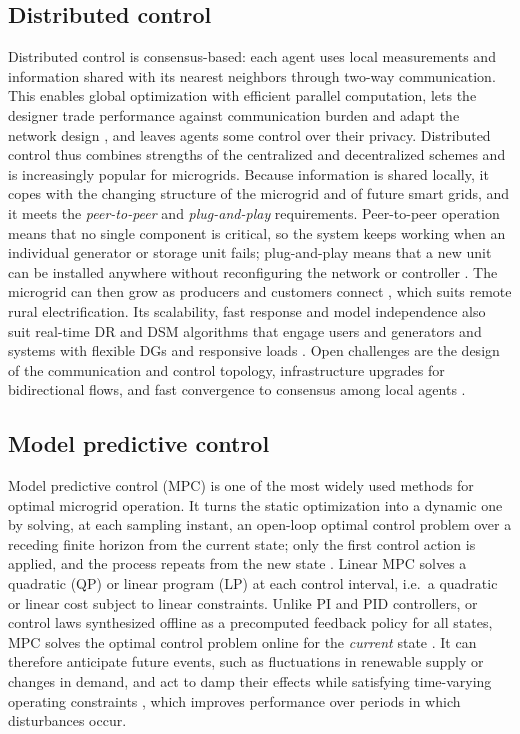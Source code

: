 \documentclass[final,3p,times]{elsarticle}
\begin{document}
\subsection{Distributed control}

Distributed control is consensus-based: each agent uses local measurements and information shared with its nearest neighbors through two-way communication. This enables global optimization with efficient parallel computation, lets the designer trade performance against communication burden and adapt the network design \cite{farina2012}, and leaves agents some control over their privacy. Distributed control thus combines strengths of the centralized and decentralized schemes and is increasingly popular for microgrids. Because information is shared locally, it copes with the changing structure of the microgrid and of future smart grids, and it meets the \textit{peer-to-peer} and \textit{plug-and-play} requirements. Peer-to-peer operation means that no single component is critical, so the system keeps working when an individual generator or storage unit fails; plug-and-play means that a new unit can be installed anywhere without reconfiguring the network or controller \cite{mg_prop}. The microgrid can then grow as producers and customers connect \cite{pourbabak2017}, which suits remote rural electrification. Its scalability, fast response and model independence also suit real-time DR and DSM algorithms that engage users and generators \cite{deng2014} and systems with flexible DGs and responsive loads \cite{dist_1, dist_2}. Open challenges are the design of the communication and control topology, infrastructure upgrades for bidirectional flows, and fast convergence to consensus among local agents \cite{pourbabak2017}.

\subsection{Model predictive control \label{app:mpc}}

Model predictive control (MPC) is one of the most widely used methods for optimal microgrid operation. It turns the static optimization into a dynamic one by solving, at each sampling instant, an open-loop optimal control problem over a receding finite horizon from the current state; only the first control action is applied, and the process repeats from the new state \cite{mpc}. Linear MPC solves a quadratic (QP) or linear program (LP) at each control interval, i.e.\ a quadratic or linear cost subject to linear constraints. Unlike PI and PID controllers, or control laws synthesized offline as a precomputed feedback policy for all states, MPC solves the optimal control problem online for the \textit{current} state \cite{mpc}. It can therefore anticipate future events, such as fluctuations in renewable supply or changes in demand, and act to damp their effects while satisfying time-varying operating constraints \cite{parisio2014}, which improves performance over periods in which disturbances occur.
\end{document}
